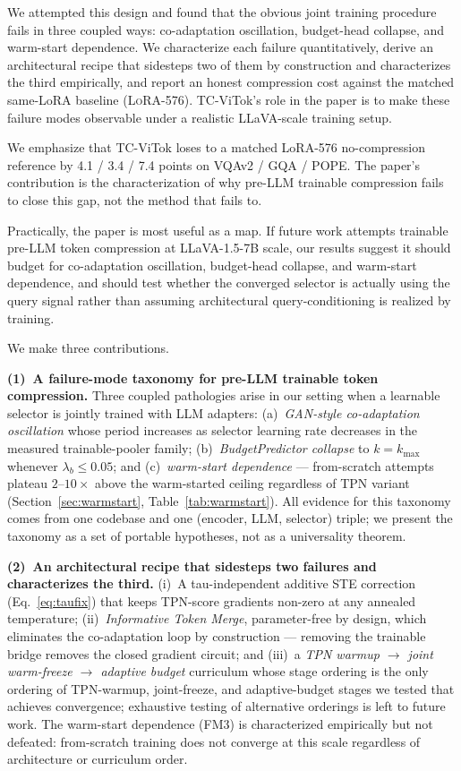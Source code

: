\documentclass{article}
\begin{document}
We attempted this design and found that the obvious joint training procedure fails in
three coupled ways: co-adaptation oscillation, budget-head collapse, and warm-start
dependence. We characterize each failure quantitatively, derive an architectural recipe
that sidesteps two of them by construction and characterizes the third empirically, and
report an honest compression cost against the matched same-LoRA baseline
(\textsc{LoRA-576}). TC-ViTok's role in the paper is to make these
failure modes observable under a realistic LLaVA-scale training setup.

We emphasize that TC-ViTok loses to a matched LoRA-576 no-compression
reference by 4.1 / 3.4 / 7.4 points on VQAv2 / GQA / POPE. The paper's
contribution is the characterization of why pre-LLM trainable compression
fails to close this gap, not the method that fails to.

Practically, the paper is most useful as a map. If future work attempts
trainable pre-LLM token compression at LLaVA-1.5-7B scale, our results suggest
it should budget for co-adaptation oscillation, budget-head collapse, and
warm-start dependence, and should test whether the converged selector is
actually using the query signal rather than assuming architectural
query-conditioning is realized by training.

We make three contributions.

\textbf{(1)~A failure-mode taxonomy for pre-LLM trainable token compression.}
Three coupled pathologies arise in our setting when a learnable selector is jointly trained with
LLM adapters: (a)~\emph{GAN-style co-adaptation oscillation} whose period
increases as selector learning rate decreases in the measured trainable-pooler
family; (b)~\emph{BudgetPredictor collapse}
to $k{=}k_{\max}$ whenever $\lambda_b\!\leq\!0.05$; and (c)~\emph{warm-start
dependence} — from-scratch attempts plateau $2$--$10{\times}$ above the warm-started
ceiling regardless of TPN variant (Section~\ref{sec:warmstart},
Table~\ref{tab:warmstart}).
All evidence for this taxonomy comes from one codebase and one
(encoder, LLM, selector) triple; we present the taxonomy as a set of
portable hypotheses, not as a universality theorem.

\textbf{(2)~An architectural recipe that sidesteps two failures and characterizes
the third.}
(i)~A tau-independent additive STE correction (Eq.~\ref{eq:taufix}) that keeps
TPN-score gradients non-zero at any annealed temperature; (ii)~\emph{Informative
Token Merge}, parameter-free by design, which eliminates the co-adaptation loop by
construction — removing the trainable bridge removes the closed gradient circuit;
and (iii)~a \emph{TPN warmup $\to$ joint warm-freeze $\to$ adaptive budget}
curriculum whose stage ordering is the only ordering of TPN-warmup, joint-freeze,
and adaptive-budget stages we tested that achieves convergence; exhaustive
testing of alternative orderings is left to future work. The warm-start
dependence (FM3) is characterized
empirically but not defeated: from-scratch training does not converge at this scale
regardless of architecture or curriculum order.
\end{document}

